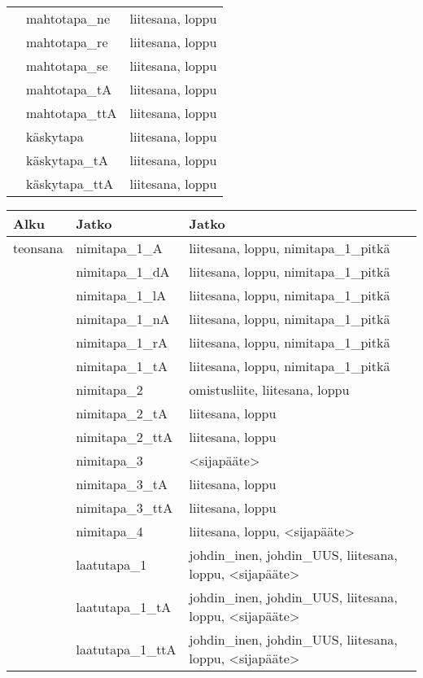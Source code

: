 \begin{tabular}{|l|l|l|}
         & mahtotapa\_ne  & liitesana, loppu \\
         & mahtotapa\_re  & liitesana, loppu \\
         & mahtotapa\_se  & liitesana, loppu \\
         & mahtotapa\_tA  & liitesana, loppu \\
         & mahtotapa\_ttA & liitesana, loppu \\ \hline
         & käskytapa      & liitesana, loppu \\
         & käskytapa\_tA  & liitesana, loppu \\
         & käskytapa\_ttA & liitesana, loppu \\
\hline
\end{tabular}

\begin{tabular}{|l|l|l|}
\hline
Alku     & Jatko             & Jatko \\
\hline
teonsana & nimitapa\_1\_A    & liitesana, loppu, nimitapa\_1\_pitkä \\
         & nimitapa\_1\_dA   & liitesana, loppu, nimitapa\_1\_pitkä \\
         & nimitapa\_1\_lA   & liitesana, loppu, nimitapa\_1\_pitkä \\
         & nimitapa\_1\_nA   & liitesana, loppu, nimitapa\_1\_pitkä \\
         & nimitapa\_1\_rA   & liitesana, loppu, nimitapa\_1\_pitkä \\
         & nimitapa\_1\_tA   & liitesana, loppu, nimitapa\_1\_pitkä \\ \hline
         & nimitapa\_2       & omistusliite, liitesana, loppu \\
         & nimitapa\_2\_tA   & liitesana, loppu \\
         & nimitapa\_2\_ttA  & liitesana, loppu \\ \hline
         & nimitapa\_3       & <sijapääte> \\
         & nimitapa\_3\_tA   & liitesana, loppu \\
         & nimitapa\_3\_ttA  & liitesana, loppu \\ \hline
         & nimitapa\_4       & liitesana, loppu, <sijapääte> \\ \hline
         & laatutapa\_1      & johdin\_inen, johdin\_UUS, liitesana, loppu, <sijapääte> \\
         & laatutapa\_1\_tA  & johdin\_inen, johdin\_UUS, liitesana, loppu, <sijapääte> \\
         & laatutapa\_1\_ttA & johdin\_inen, johdin\_UUS, liitesana, loppu, <sijapääte> \\ \hline

\end{tabular}
